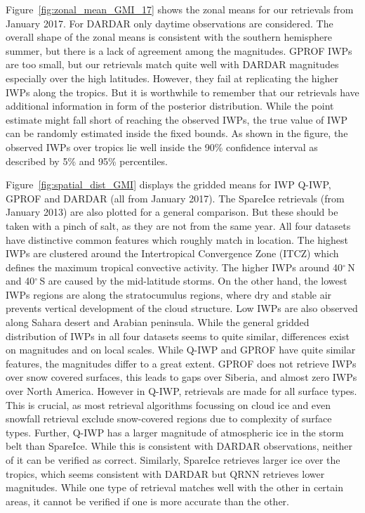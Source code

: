 \documentclass[amt, manuscript]{copernicus}
\begin{document}
Figure~\ref{fig:zonal_mean_GMI_17} shows the zonal means for our retrievals from January 2017. For DARDAR only daytime observations are considered. The overall shape of the zonal means is consistent with the southern hemisphere summer, but there is a lack of agreement among the magnitudes. GPROF IWPs are too small, but our retrievals match quite well with DARDAR magnitudes especially over the high latitudes. However, they fail at replicating the higher IWPs along the tropics. But it is worthwhile to remember that our retrievals have additional information in form of the  posterior distribution. While the point estimate might fall short of reaching the observed IWPs, the true value of IWP can be randomly estimated inside the fixed bounds. As shown in the figure, the observed IWPs over tropics lie well inside the 90\% confidence interval as described by 5\% and 95\% percentiles.
  

Figure~\ref{fig:spatial_dist_GMI} displays the gridded means for IWP Q-IWP, GPROF and DARDAR (all from January 2017). The SpareIce retrievals (from January 2013) are also plotted for a general comparison. But these should be taken with a pinch of salt, as they are not from the same year. All four datasets have distinctive common features which roughly match in location. The highest IWPs are clustered around the Intertropical  Convergence Zone (ITCZ) which defines the maximum tropical convective activity. The higher IWPs around 40$^\circ$\,N and 40$^\circ$\,S are caused by the mid-latitude storms. On the other hand, the lowest IWPs regions are along the stratocumulus regions, where dry and stable air prevents vertical development of the cloud structure. Low IWPs are also observed along Sahara desert and Arabian peninsula. While the general gridded distribution of IWPs in all four datasets seems to quite similar, differences exist on magnitudes and on local scales. While Q-IWP and GPROF have quite similar features, the magnitudes differ to a great extent. GPROF does not retrieve IWPs over snow covered surfaces, this leads to gaps over Siberia, and almost zero IWPs over North America. However in Q-IWP, retrievals are made for all surface types. This is crucial, as most retrieval algorithms focussing on cloud ice and even snowfall retrieval \citep{rysman:slalom:18} exclude snow-covered regions due to complexity of surface types. Further, Q-IWP has a larger magnitude of atmospheric ice in the storm belt than SpareIce. While this is consistent with DARDAR observations, neither of it can be verified as correct. Similarly, SpareIce retrieves larger ice over the tropics, which seems consistent with DARDAR but QRNN retrieves lower magnitudes. While one type of retrieval matches well with the other in certain areas, it cannot be verified if one is more accurate than the other.  
\end{document}
